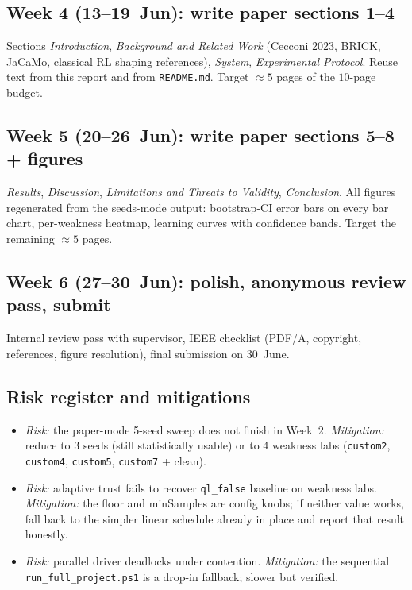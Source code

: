 \documentclass[conference]{IEEEtran}
\begin{document}
\subsection{Week 4 (13--19~Jun): write paper sections 1--4}
Sections \emph{Introduction}, \emph{Background and Related Work}
(Cecconi 2023, BRICK, JaCaMo, classical RL shaping references),
\emph{System}, \emph{Experimental Protocol}. Reuse text from this
report and from \verb|README.md|. Target $\approx 5$ pages of the
$10$-page budget.

\subsection{Week 5 (20--26~Jun): write paper sections 5--8 + figures}
\emph{Results}, \emph{Discussion}, \emph{Limitations and Threats to
Validity}, \emph{Conclusion}. All figures regenerated from the
seeds-mode output: bootstrap-CI error bars on every bar chart,
per-weakness heatmap, learning curves with confidence bands.
Target the remaining $\approx 5$ pages.

\subsection{Week 6 (27--30~Jun): polish, anonymous review pass, submit}
Internal review pass with supervisor, IEEE checklist
(PDF/A, copyright, references, figure resolution), final submission
on 30~June.

\subsection{Risk register and mitigations}
\begin{itemize}
  \item \emph{Risk:} the paper-mode 5-seed sweep does not finish in
        Week~2. \emph{Mitigation:} reduce to 3 seeds (still
        statistically usable) or to 4 weakness labs (\texttt{custom2},
        \texttt{custom4}, \texttt{custom5}, \texttt{custom7} + clean).
  \item \emph{Risk:} adaptive trust fails to recover \texttt{ql\_false}
        baseline on weakness labs. \emph{Mitigation:} the floor and
        minSamples are config knobs; if neither value works, fall back
        to the simpler linear schedule already in place and report
        that result honestly.
  \item \emph{Risk:} parallel driver deadlocks under contention.
        \emph{Mitigation:} the sequential
        \verb|run_full_project.ps1| is a drop-in fallback;
        slower but verified.
\end{itemize}
\end{document}
